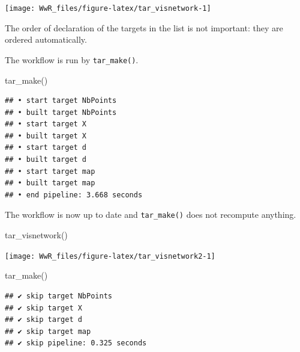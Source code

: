 \documentclass[
  12pt,
  american,
  a4paper,
  extrafontsizes,onecolumn,openright
  ]{memoir}
\newenvironment{Shaded}{\begin{snugshade}}{\end{snugshade}}
\newcommand{\FunctionTok}[1]{\textcolor[rgb]{0.00,0.00,0.00}{#1}}
\newcommand{\NormalTok}[1]{#1}
\begin{document}
\begin{center}\texttt{[image: WwR\_files/figure-latex/tar\_visnetwork-1]} \end{center}

\normalsize

The order of declaration of the targets in the list is not important: they are ordered automatically.

The workflow is run by \texttt{tar\_make()}.

\scriptsize

\begin{Shaded}
\begin{Highlighting}[]
\FunctionTok{tar\_make}\NormalTok{()}
\end{Highlighting}
\end{Shaded}

\begin{verbatim}
## • start target NbPoints
## • built target NbPoints
## • start target X
## • built target X
## • start target d
## • built target d
## • start target map
## • built target map
## • end pipeline: 3.668 seconds
\end{verbatim}

\normalsize

The workflow is now up to date and \texttt{tar\_make()} does not recompute anything.

\scriptsize

\begin{Shaded}
\begin{Highlighting}[]
\FunctionTok{tar\_visnetwork}\NormalTok{()}
\end{Highlighting}
\end{Shaded}

\begin{center}\texttt{[image: WwR\_files/figure-latex/tar\_visnetwork2-1]} \end{center}

\begin{Shaded}
\begin{Highlighting}[]
\FunctionTok{tar\_make}\NormalTok{()}
\end{Highlighting}
\end{Shaded}

\begin{verbatim}
## ✔ skip target NbPoints
## ✔ skip target X
## ✔ skip target d
## ✔ skip target map
## ✔ skip pipeline: 0.325 seconds
\end{verbatim}

\normalsize
\end{document}
